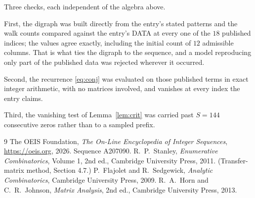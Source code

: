 \documentclass[11pt,a4paper]{article}
\theoremstyle{plain}
\theoremstyle{definition}
\begin{document}
Three checks, each independent of the algebra above.

First, the digraph was built directly from the entry's stated patterns and the walk counts
compared against the entry's DATA at every one of the $18$ published indices; the
values agree exactly, including the initial count of $12$ admissible columns. That is
what ties the digraph to the sequence, and a model reproducing only part of the published
data was rejected wherever it occurred.

Second, the recurrence \eqref{eq:conj} was evaluated on those published terms in exact
integer arithmetic, with no matrices involved, and vanishes at every index the entry claims.

Third, the vanishing test of Lemma~\ref{lem:crit} was carried past $S=144$ consecutive
zeros rather than to a sampled prefix.

\begin{thebibliography}{9}
 The OEIS Foundation, \emph{The On-Line Encyclopedia of Integer
Sequences}, \url{https://oeis.org}, 2026. Sequence A207090.
 R.~P.~Stanley, \emph{Enumerative Combinatorics}, Volume 1, 2nd ed.,
Cambridge University Press, 2011. (Transfer-matrix method, Section 4.7.)
 P.~Flajolet and R.~Sedgewick, \emph{Analytic Combinatorics}, Cambridge
University Press, 2009.
 R.~A.~Horn and C.~R.~Johnson, \emph{Matrix Analysis}, 2nd ed., Cambridge
University Press, 2013.
\end{thebibliography}
\end{document}
